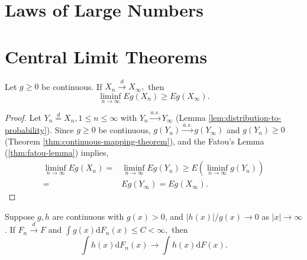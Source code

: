 \section{Laws of Large Numbers}

\section{Central Limit Theorems}

\begin{exercise}
    Let $g\geq 0$ be continuous. If $X_{n}\stackrel{d}{\rightarrow}X_{\infty},$ then
    \begin{equation*}
        \liminf_{n\rightarrow\infty}Eg\left(X_{n}\right)\geq Eg\left(X_{\infty}\right).
    \end{equation*}
    \label{ex:fatou-lemma-distribution}
\end{exercise}

\begin{proof}
    Let $Y_n\stackrel{d}{=}X_n,1\leq n\leq\infty$ with $Y_n\stackrel{a.s.}{\rightarrow}Y_\infty$ (Lemma \ref{lem:distribution-to-probability}).
    Since $g\geq 0$ be continuous, $g(Y_n)\stackrel{a.s.}{\rightarrow}g(Y_\infty)$ and $g(Y_n)\geq 0$ (Theorem \ref{thm:continuous-mapping-theorem}), and the Fatou's Lemma (\ref{thm:fatou-lemma}) implies,
    \begin{equation*}
        \begin{aligned}
            \liminf_{n\rightarrow\infty}Eg(X_n)= & \liminf_{n\rightarrow\infty}Eg(Y_n)\geq E\left(\liminf_{n\rightarrow\infty}g(Y_n)\right) \\
            =                                    & Eg(Y_\infty)=Eg(X_\infty).
        \end{aligned}
    \end{equation*}
\end{proof}

\begin{exercise}
    Suppose $g,h$ are continuous with $g(x)>0$, and $|h(x)|/g(x)\rightarrow 0$ as $|x|\rightarrow\infty$. If $F_{n}\stackrel{d}{\rightarrow}F$ and $\int g(x)\mathrm{d}F_{n}(x)\leq C<\infty,$ then
    \begin{equation*}
        \int h(x)\mathrm{d}F_{n}(x) \rightarrow \int h(x)\mathrm{d}F(x).
    \end{equation*}
\end{exercise}

